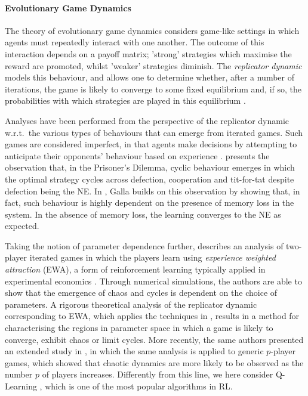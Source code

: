 \documentclass[sigconf,anonymous]{aamas}
\begin{document}
\paragraph{Evolutionary Game Dynamics}
The theory of evolutionary game dynamics \cite{Morgenstern44}
considers game-like settings in which agents must repeatedly interact
with one another. The outcome of this interaction depends on a payoff
matrix; 'strong' strategies which maximise the reward are promoted,
whilst 'weaker' strategies diminish. The \textit{replicator dynamic}
models this behaviour, and allows one to determine whether, after a
number of iterations, the game is likely to converge to some fixed
equilibrium and, if so, the probabilities with which strategies are
played in this equilibrium \cite{ShohamMultiagentFoundations}.

Analyses have been performed from the perspective of the replicator
dynamic w.r.t.~the various types of behaviours that can emerge from
iterated games. Such games are considered imperfect, in that agents
make decisions by attempting to anticipate their opponents' behaviour
based on experience \cite{Galla2011}. \cite{Imhof2005} presents the
observation that, in the Prisoner's Dilemma, cyclic behaviour
emerges in which the optimal strategy cycles across defection,
cooperation and tit-for-tat despite defection being the
NE. In \cite{Galla2011}, Galla builds on this observation by showing that, in fact,
such behaviour is highly dependent on the presence of memory loss in
the system. In the absence of memory loss, the learning converges to
the NE as expected.

Taking the notion of parameter dependence further, \cite{Galla2013}
describes an analysis of two-player iterated games in which the
players learn using \textit{experience weighted attraction} (EWA), a
form of reinforcement learning typically applied in experimental
economics \cite{Camerer2009}. Through numerical simulations, the
authors are able to show that the emergence of chaos and cycles is
dependent on the choice of parameters.
A rigorous theoretical analysis of the replicator dynamic
corresponding to EWA, which applies the techniques in
\cite{Opper1992}, results in a method for characterising the regions
in parameter space in which a game is likely to converge, exhibit
chaos or limit cycles. More recently, the same authors presented an
extended study in \cite{Sanders2018}, in which the same analysis is
applied to generic $p$-player games, which showed that chaotic
dynamics are more likely to be observed as the number $p$ of players
increases. Differently from this line, we here consider 
 Q-Learning \cite{Barber2012}, which is one of the most popular
 algorithms in RL.
\end{document}
